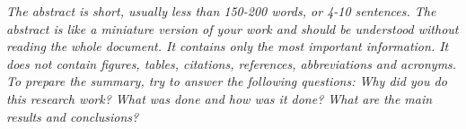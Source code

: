 \textit{The abstract is short, usually less than 150-200 words, or 4-10 sentences. The abstract is like a miniature version of your work and should be understood without reading the whole document. It contains only the most important information. It does not contain figures, tables, citations, references, abbreviations and acronyms. To prepare the summary, try to answer the following questions: Why did you do this research work? What was done and how was it done? What are the main results and conclusions?}
